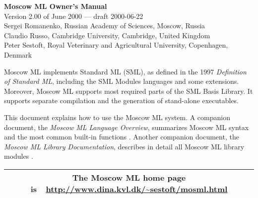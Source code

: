 \documentclass[fleqn,a4paper]{article}
\begin{document}
\begin{center}

  {\huge\bf Moscow ML Owner's Manual}\\[0.5cm]

Version 2.00 of June 2000 --- draft 2000-06-22\\[0.5cm]

Sergei Romanenko, Russian Academy of Sciences, Moscow, Russia\\
Claudio Russo, Cambridge University, Cambridge, United Kingdom\\
Peter Sestoft, Royal Veterinary and Agricultural University, 
Copenhagen, Denmark

\end{center}

\vspace{0.5cm}

\noindent 
Moscow ML implements Standard ML (SML), as defined in the 1997 {\em
  Definition of Standard ML\/}, including the SML Modules languages
and some extensions.  Moreover, Moscow ML supports most required parts
of the SML Basis Library.  It supports separate compilation and the
generation of stand-alone executables.

This document explains how to use the Moscow ML system.  A companion
document, the {\em Moscow ML Language Overview\/}, summarizes Moscow
ML syntax and the most common built-in functions
\cite{MoscowML:2000:MoscowMLLanguage}.  Another companion document,
the \emph{Moscow ML Library Documentation}, describes in detail all
Moscow ML library modules \cite{MoscowML:2000:MoscowMLLibrary}. 

\vspace{0.5cm}

\tableofcontents

\vfill

\begin{center}
\begin{tabular}{|c|}\hline
\rule[-0.4cm]{0cm}{1cm}The Moscow ML home page is\ \
    \url{http://www.dina.kvl.dk/~sestoft/mosml.html}\\\hline
\end{tabular}
\end{center}
\end{document}
